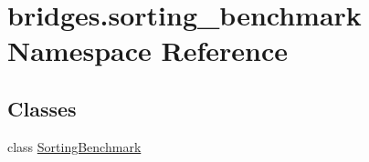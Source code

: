 \hypertarget{namespacebridges_1_1sorting__benchmark}{}\section{bridges.\+sorting\+\_\+benchmark Namespace Reference}
\label{namespacebridges_1_1sorting__benchmark}
\subsection*{Classes}
\begin{DoxyCompactItemize}
\item 
class \hyperlink{classbridges_1_1sorting__benchmark_1_1_sorting_benchmark}{Sorting\+Benchmark}
\end{DoxyCompactItemize}
